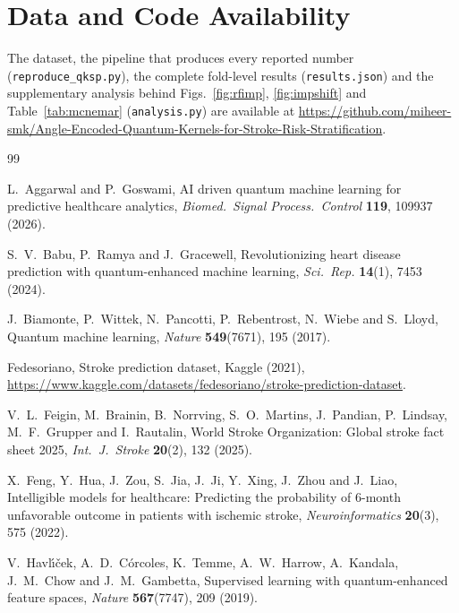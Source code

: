 \documentclass{ws-ijqi}
\begin{document}
\section*{Data and Code Availability}
\sloppy

The dataset, the pipeline that produces every reported number
(\texttt{reproduce\_qksp.py}), the complete fold-level results
(\texttt{results.json}) and the supplementary analysis behind
Figs.~\ref{fig:rfimp}, \ref{fig:impshift} and Table~\ref{tab:mcnemar}
(\texttt{analysis.py}) are available at
\url{https://github.com/miheer-smk/Angle-Encoded-Quantum-Kernels-for-Stroke-Risk-Stratification}.

\begin{thebibliography}{99}

L.~Aggarwal and P.~Goswami,
AI driven quantum machine learning for predictive healthcare analytics,
\textit{Biomed.\ Signal Process.\ Control} \textbf{119}, 109937 (2026).

S.~V.~Babu, P.~Ramya and J.~Gracewell,
Revolutionizing heart disease prediction with quantum-enhanced machine
learning, \textit{Sci.\ Rep.} \textbf{14}(1), 7453 (2024).

J.~Biamonte, P.~Wittek, N.~Pancotti, P.~Rebentrost, N.~Wiebe and S.~Lloyd,
Quantum machine learning, \textit{Nature} \textbf{549}(7671), 195 (2017).

Fedesoriano, Stroke prediction dataset, Kaggle (2021),
\url{https://www.kaggle.com/datasets/fedesoriano/stroke-prediction-dataset}.

V.~L.~Feigin, M.~Brainin, B.~Norrving, S.~O.~Martins, J.~Pandian,
P.~Lindsay, M.~F.~Grupper and I.~Rautalin,
World Stroke Organization: Global stroke fact sheet 2025,
\textit{Int.\ J.\ Stroke} \textbf{20}(2), 132 (2025).

X.~Feng, Y.~Hua, J.~Zou, S.~Jia, J.~Ji, Y.~Xing, J.~Zhou and J.~Liao,
Intelligible models for healthcare: Predicting the probability of 6-month
unfavorable outcome in patients with ischemic stroke,
\textit{Neuroinformatics} \textbf{20}(3), 575 (2022).

V.~Havl\'{\i}\v{c}ek, A.~D.~C\'orcoles, K.~Temme, A.~W.~Harrow, A.~Kandala,
J.~M.~Chow and J.~M.~Gambetta,
Supervised learning with quantum-enhanced feature spaces,
\textit{Nature} \textbf{567}(7747), 209 (2019).


\end{thebibliography}
\end{document}
